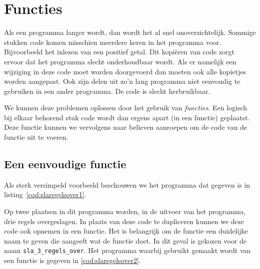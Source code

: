 \chapter{Functies}
\label{cha:functies}
\thispagestyle{empty}


Als een programma langer wordt, dan wordt het al snel onoverzichtelijk.
Sommige stukken code komen misschien meerdere keren in het programma voor.
Bijvoorbeeld het inlezen van een positief getal.
Dit kopiëren van code zorgt ervoor dat het programma slecht onderhoudbaar wordt.
Als er namelijk een wijziging in deze code moet worden doorgevoerd dan moeten ook alle kopietjes worden aangepast. 
Ook zijn delen uit zo'n lang programma niet eenvoudig te gebruiken in een ander programma.
De code is slecht herbruikbaar.

We kunnen deze problemen oplossen door het gebruik van \textsl{functies}.
Een logisch bij elkaar behorend stuk code wordt dan ergens apart (in een functie) geplaatst.
Deze functie kunnen we vervolgens naar believen aanroepen om de code van de functie uit te voeren.


\newpage
\section{Een eenvoudige functie}
Als sterk versimpeld voorbeeld beschouwen we het programma dat gegeven is in listing~\ref{cod:slaregelsover1}.




Op twee plaatsen in dit programma worden, in de uitvoer van het programma, drie regels overgeslagen.
In plaats van deze code te dupliceren kunnen we deze code ook opnemen in een functie.
Het is belangrijk om de functie een duidelijke naam te geven die aangeeft wat de functie doet.
In dit geval is gekozen voor de naam \texttt{sla\_3\_regels\_over}.
Het programma waarbij gebruikt gemaakt wordt van een functie is gegeven in \ref{cod:slaregelsover2}.






